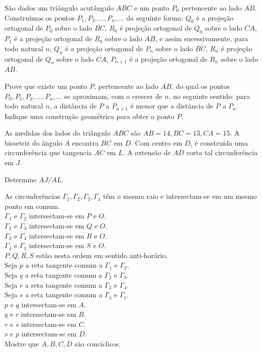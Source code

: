 \begin{questao}
  São dados um triângulo acutângulo $ABC$ e um ponto $P_0$ pertencente ao lado
  $\overbar{AB}$. Construímos os pontos $P_1,P_2,\ldots,P_n,\ldots$ da seguinte
  forma: $Q_0$ é a projeção ortogonal de $P_0$ sobre o lado $\overbar{BC}$,
  $R_0$ é projeção ortogonal de $Q_0$ sobre o lado $\overbar{CA}$, $P_1$ é a
  projeção ortogonal de $R_0$ sobre o lado $\overbar{AB}$, e assim
  sucessivamente, para todo natural $n$, $Q_n$ é a projeção ortogonal de $P_n$
  sobre o lado $\overbar{BC}$, $R_n$ é projeção ortogonal de $Q_n$ sobre o lado
  $\overbar{CA}$, $P_{n+1}$ é a projeção ortogonal de $R_n$ sobre o lado
  $\overbar{AB}$.

  Prove que existe um ponto $P$, pertencente ao lado $\overbar{AB}$, do qual os
  pontos $P_0,P_1,P_2,\ldots,P_n,\ldots$ se aproximam, com o crescer de $n$, no
  seguinte sentido: para todo natural $n$, a distância de $P$ a $P_{n+1}$ é
  menor que a distância de $P$ a $P_n$. Indique uma construção geométrica para
  obter o ponto $P$.
\end{questao}

\begin{questao}
  As medidas dos lados do triângulo $ABC$ são
  $AB=14,BC=13,CA=15$. A bissetriz do ângulo $A$ encontra
  $\overbar{BC}$ em $D$. Com centro em $D$, é construída uma
  circunferência que tangencia $\overbar{AC}$ em $L$. A extensão
  de $AD$ corta tal circunferência em $J$.

  Determine $AJ/AL$.
\end{questao}

\begin{questao}
  As circunferências $\Gamma_1,\Gamma_2,\Gamma_3,\Gamma_4$
  têm o mesmo raio e intersectam-se em um mesmo ponto em comum.\\
  $\Gamma_1$ e $\Gamma_2$ intersectam-se em $P$ e $O$.\\
  $\Gamma_2$ e $\Gamma_3$ intersectam-se em $Q$ e $O$.\\
  $\Gamma_3$ e $\Gamma_4$ intersectam-se em $R$ e $O$.\\
  $\Gamma_4$ e $\Gamma_1$ intersectam-se em $S$ e $O$.\\
  $P,Q,R,S$ estão nesta ordem em sentido anti-horário.\\
  Seja $p$ a reta tangente comum a $\Gamma_1$ e $\Gamma_2$.\\
  Seja $q$ a reta tangente comum a $\Gamma_2$ e $\Gamma_3$.\\
  Seja $r$ a reta tangente comum a $\Gamma_3$ e $\Gamma_4$.\\
  Seja $s$ a reta tangente comum a $\Gamma_4$ e $\Gamma_1$.\\
  $p$ e $q$ intersectam-se em $A$.\\
  $q$ e $r$ intersectam-se em $B$.\\
  $r$ e $s$ intersectam-se em $C$.\\
  $s$ e $p$ intersectam-se em $D$.\\

  Mostre que $A,B,C,D$ são concíclicos.
\end{questao}

